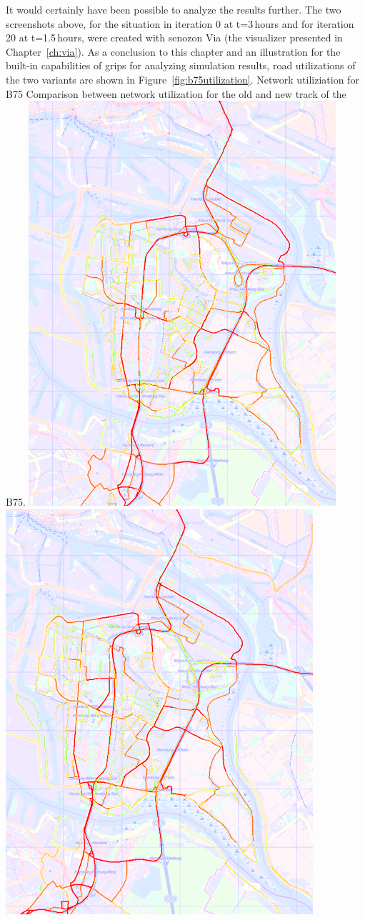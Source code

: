 It would certainly have been possible to analyze the results further. The two screenshots above, for the situation in iteration 0 at t=3\,hours and for iteration 20 at t=1.5\,hours, were created with \gls{senozon} Via (the visualizer presented in Chapter~\ref{ch:via}). As a conclusion to this chapter and an illustration for the built-in capabilities of \gls{grips} for analyzing simulation results, road utilizations of the two variants are shown in Figure~\ref{fig:b75utilization}.
%
\createfigure%
{Network utiliziation for B75}%
{Comparison between network utilization for the old and new track of the B75.}%
{\label{fig:b75utilization}}%
{%
  \createsubfigure%
  {}%
  {\includegraphics[width=.475\linewidth]{using/figures/b75utilizationold}}%
  {}%
  {}%
  \createsubfigure%
  {}%
  {\includegraphics[width=.475\linewidth]{using/figures/b75utilizationnew}}
  {}%
  {}%
}%
  {}%
